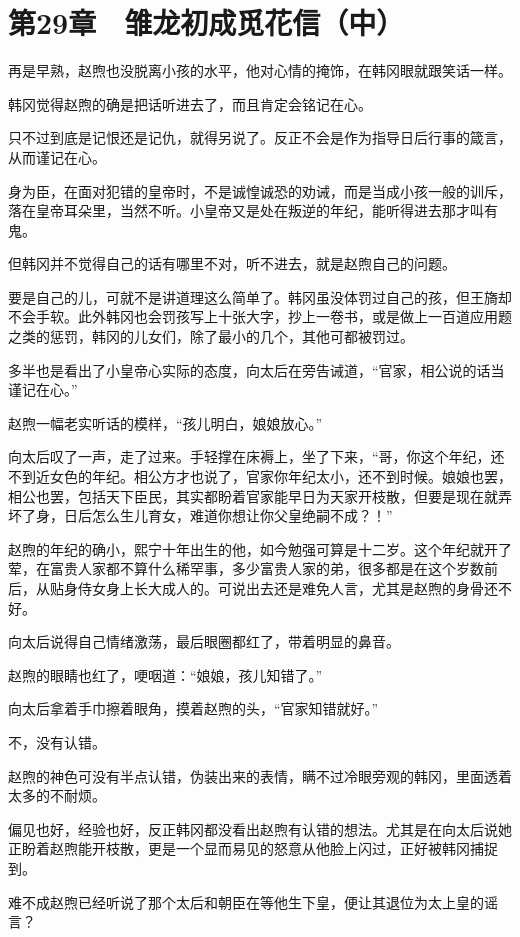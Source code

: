 \section{第29章　雏龙初成觅花信（中）}

再是早熟，赵煦也没脱离小孩的水平，他对心情的掩饰，在韩冈眼就跟笑话一样。

韩冈觉得赵煦的确是把话听进去了，而且肯定会铭记在心。

只不过到底是记恨还是记仇，就得另说了。反正不会是作为指导日后行事的箴言，从而谨记在心。

身为臣，在面对犯错的皇帝时，不是诚惶诚恐的劝诫，而是当成小孩一般的训斥，落在皇帝耳朵里，当然不听。小皇帝又是处在叛逆的年纪，能听得进去那才叫有鬼。

但韩冈并不觉得自己的话有哪里不对，听不进去，就是赵煦自己的问题。

要是自己的儿，可就不是讲道理这么简单了。韩冈虽没体罚过自己的孩，但王旖却不会手软。此外韩冈也会罚孩写上十张大字，抄上一卷书，或是做上一百道应用题之类的惩罚，韩冈的儿女们，除了最小的几个，其他可都被罚过。

多半也是看出了小皇帝心实际的态度，向太后在旁告诫道，“官家，相公说的话当谨记在心。”

赵煦一幅老实听话的模样，“孩儿明白，娘娘放心。”

向太后叹了一声，走了过来。手轻撑在床褥上，坐了下来，“哥，你这个年纪，还不到近女色的年纪。相公方才也说了，官家你年纪太小，还不到时候。娘娘也罢，相公也罢，包括天下臣民，其实都盼着官家能早日为天家开枝散，但要是现在就弄坏了身，日后怎么生儿育女，难道你想让你父皇绝嗣不成？！”

赵煦的年纪的确小，熙宁十年出生的他，如今勉强可算是十二岁。这个年纪就开了荤，在富贵人家都不算什么稀罕事，多少富贵人家的弟，很多都是在这个岁数前后，从贴身侍女身上长大成人的。可说出去还是难免人言，尤其是赵煦的身骨还不好。

向太后说得自己情绪激荡，最后眼圈都红了，带着明显的鼻音。

赵煦的眼睛也红了，哽咽道：“娘娘，孩儿知错了。”

向太后拿着手巾擦着眼角，摸着赵煦的头，“官家知错就好。”

不，没有认错。

赵煦的神色可没有半点认错，伪装出来的表情，瞒不过冷眼旁观的韩冈，里面透着太多的不耐烦。

偏见也好，经验也好，反正韩冈都没看出赵煦有认错的想法。尤其是在向太后说她正盼着赵煦能开枝散，更是一个显而易见的怒意从他脸上闪过，正好被韩冈捕捉到。

难不成赵煦已经听说了那个太后和朝臣在等他生下皇，便让其退位为太上皇的谣言？

